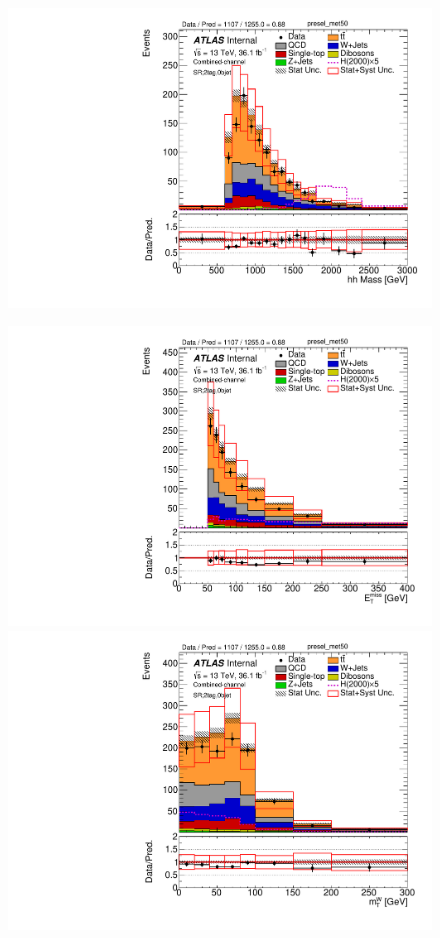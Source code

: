 \begin{figure}[!h]
\begin{center}
\includegraphics[scale=0.33]{./figures/boosted/PlotsInMbbSR/Unblinded/DataMC_2tag_0bjet_SR_lepton_presel_met50_hhMassRebin1} \\
\par\medskip
\includegraphics[scale=0.33]{./figures/boosted/PlotsInMbbSR/Unblinded/DataMC_2tag_0bjet_SR_lepton_presel_met50_MET}
\includegraphics[scale=0.33]{./figures/boosted/PlotsInMbbSR/Unblinded/DataMC_2tag_0bjet_SR_lepton_presel_met50_WlepMtATLAS}

\end{center}
\end{figure}
